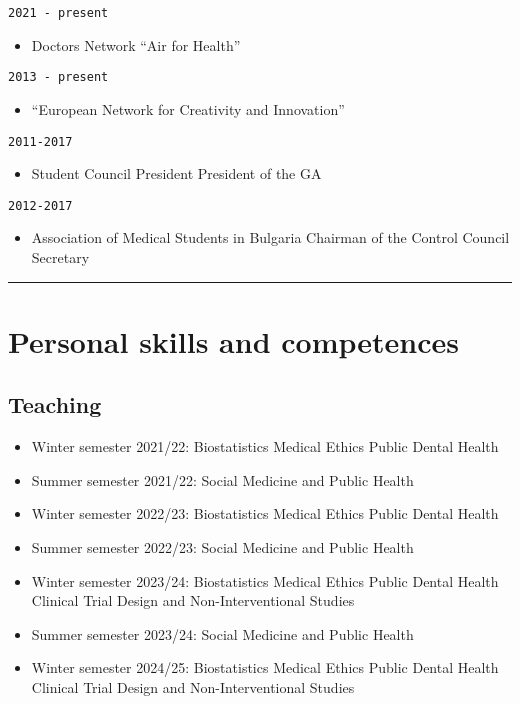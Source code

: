 \documentclass[
  12pt,
  letterpaper,
  DIV=11,
  numbers=noendperiod]{scrartcl}
\providecommand{\tightlist}{%
  \setlength{\itemsep}{0pt}\setlength{\parskip}{0pt}}\usepackage{longtable,booktabs,array}
\begin{document}
\texttt{2021\ -\ present}

\begin{itemize}
\tightlist
\item
  Doctors Network ``Air for Health''
\end{itemize}

\texttt{2013\ -\ present}

\begin{itemize}
\tightlist
\item
  ``European Network for Creativity and Innovation''
\end{itemize}

\texttt{2011-2017}

\begin{itemize}
\tightlist
\item
  Student Council President \textbar{} President of the GA
\end{itemize}

\texttt{2012-2017}

\begin{itemize}
\tightlist
\item
  Association of Medical Students in Bulgaria \textbar{} Chairman of the
  Control Council \textbar{} Secretary
\end{itemize}

\begin{center}\rule{0.5\linewidth}{0.5pt}\end{center}

\section{Personal skills and
competences}\label{personal-skills-and-competences}

\subsection{Teaching}\label{teaching}

\begin{itemize}
\item
  Winter semester 2021/22: Biostatistics \textbar{} Medical Ethics
  \textbar{} Public Dental Health
\item
  Summer semester 2021/22: Social Medicine and Public Health
\item
  Winter semester 2022/23: Biostatistics \textbar{} Medical Ethics
  \textbar{} Public Dental Health
\item
  Summer semester 2022/23: Social Medicine and Public Health
\item
  Winter semester 2023/24: Biostatistics \textbar{} Medical Ethics
  \textbar{} Public Dental Health \textbar{} Clinical Trial Design and
  Non-Interventional Studies
\item
  Summer semester 2023/24: Social Medicine and Public Health
\item
  Winter semester 2024/25: Biostatistics \textbar{} Medical Ethics
  \textbar{} Public Dental Health \textbar{} Clinical Trial Design and
  Non-Interventional Studies
\end{itemize}
\end{document}

